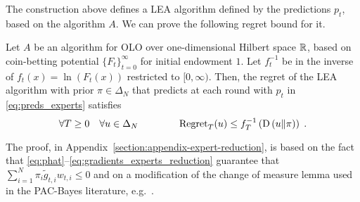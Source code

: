 The construction above defines a \ac{LEA} algorithm defined by the predictions $p_t$, based on the algorithm $A$.
We can prove the following regret bound for it.
%
\begin{theorem}
\label{theorem:regret-bound-experts}
Let $A$ be an algorithm for \ac{OLO} over
one-dimensional Hilbert space $\mathbb{R}$, based on coin-betting potential 
$\{F_t\}_{t=0}^\infty$ for initial
endowment $1$. Let $f_t^{-1}$ be in the inverse of $f_t(x) = \ln(F_t(x))$
restricted to $[0,\infty)$.  Then, the regret of the \ac{LEA}
algorithm with prior $\pi \in \Delta_N$ that predicts at each round with $p_t$ in \eqref{eq:preds_experts} satisfies
\[
\forall T \ge 0 \quad \forall u \in \Delta_N \qquad \qquad
\operatorname{Regret}_T(u) \le f_T^{-1}\left( \operatorname*{D}\left({u}\middle\|{\pi}\right) \right) \; .
\]
\end{theorem}
The proof, in Appendix~\ref{section:appendix-expert-reduction}, 
is based on the fact that \eqref{eq:phat}--\eqref{eq:gradients_experts_reduction} guarantee that $\sum_{i=1}^N \pi_i \widetilde g_{t,i} w_{t,i} \le 0$ and on a modification of the change
of measure lemma used in the PAC-Bayes literature, e.g.~\cite{McAllester-2013}.

